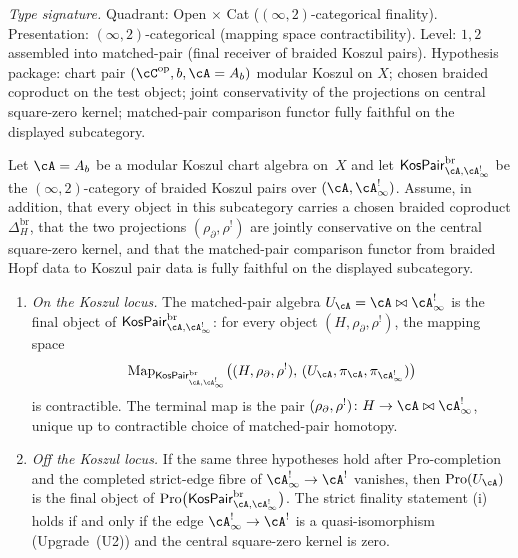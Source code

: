 \begin{theorem}
\label{thm:hdm-u-a-final-object}
\emph{Type signature.} Quadrant: Open $\times$ Cat
($(\infty,2)$-categorical finality). Presentation:
$(\infty,2)$-categorical (mapping space contractibility). Level:
$1, 2$ assembled into matched-pair (final receiver of braided Koszul
pairs). Hypothesis package: chart pair
$(\cC^{\mathrm{op}}, b, \cA = A_b)$ modular Koszul on $X$; chosen
braided coproduct on the test object; joint conservativity of the
projections on central square-zero kernel; matched-pair comparison
functor fully faithful on the displayed subcategory.

Let $\cA = A_b$ be a modular Koszul chart algebra on~$X$ and let
$\mathsf{KosPair}^{\mathrm{br}}_{\cA,\cA^!_\infty}$ be the
$(\infty,2)$-category of braided Koszul pairs over
$(\cA,\cA^!_\infty)$. Assume, in addition, that every object in this
subcategory carries a chosen braided coproduct
$\Delta_H^{\mathrm{br}}$, that the two projections
$(\rho_\partial,\rho^!)$ are jointly conservative on the
central square-zero kernel, and that the matched-pair comparison
functor from braided Hopf data to Koszul pair data is fully faithful
on the displayed subcategory.
\begin{enumerate}[label=\textup{(\roman*)}]
\item \emph{On the Koszul locus.} The matched-pair algebra
$U_\cA=\cA\bowtie\cA^!_\infty$ is the final object of
$\mathsf{KosPair}^{\mathrm{br}}_{\cA,\cA^!_\infty}$: for every
object $(H,\rho_\partial,\rho^!)$, the mapping space
\begin{equation}\label{eq:hdm-u-a-final-mapping}
\mathrm{Map}_{\mathsf{KosPair}^{\mathrm{br}}_{\cA,\cA^!_\infty}}
\bigl((H,\rho_\partial,\rho^!),\,(U_\cA,\pi_\cA,\pi_{\cA^!_\infty})\bigr)
\end{equation}
is contractible. The terminal map is the pair
$(\rho_\partial,\rho^!)\colon H\to\cA\bowtie\cA^!_\infty$, unique up
to contractible choice of matched-pair homotopy.
\item \emph{Off the Koszul locus.} If the same three hypotheses hold
after $\mathrm{Pro}$-completion and the completed strict-edge fibre of
$\cA^!_\infty\to\cA^!$ vanishes, then $\mathrm{Pro}(U_\cA)$ is the
final object of
$\mathrm{Pro}\bigl(\mathsf{KosPair}^{\mathrm{br}}_{\cA,\cA^!_\infty}\bigr)$.
The strict finality statement \textup{(i)} holds if and only if the
edge $\cA^!_\infty\to\cA^!$ is a quasi-isomorphism
\textup{(}Upgrade~\textup{(U2)}\textup{)} and the central
square-zero kernel is zero.
\end{enumerate}
\end{theorem}

